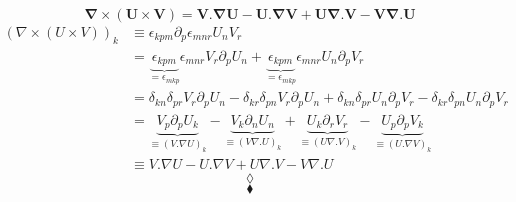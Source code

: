 $$ \mathbf{\nabla \times  \left( U\times V \right) = V . \nabla U -  U . \nabla V+U\nabla . V-V\nabla.U}$$
\begin{align}
\left(\nabla \times  \left( U\times V \right) \right)_k &\equiv \epsilon_{kpm}\partial_p \epsilon_{mnr}U_n V_r\\
&=  \underbrace{\epsilon_{kpm}}_{= \epsilon_{mkp}}\epsilon_{mnr}V_r\partial_p U_n + \underbrace{\epsilon_{kpm}}_{= \epsilon_{mkp}}\epsilon_{mnr}U_n\partial_p V_r \\
&= \delta_{kn}\delta_{pr}V_r\partial_p U_n -\delta_{kr}\delta_{pn}V_r\partial_p U_n +\delta_{kn}\delta_{pr}U_n\partial_p V_r-\delta_{kr}\delta_{pn}U_n\partial_p V_r\\
&= \underbrace{V_p\partial_p U_k}_{\equiv \left(V .\nabla U\right)_k} -\underbrace{V_k\partial_n U_n}_{\equiv \left(V\nabla .U\right)_k} +\underbrace{U_k\partial_r V_r}_{\equiv \left(U\nabla .V\right)_k}-\underbrace{U_p\partial_p V_k}_{\equiv \left(U .\nabla V\right)_k}\\
&\equiv V .\nabla U-U .\nabla V+U\nabla .V-V\nabla .U
\end{align}
$$\lozenge$$
$$\blacklozenge$$
\newpage